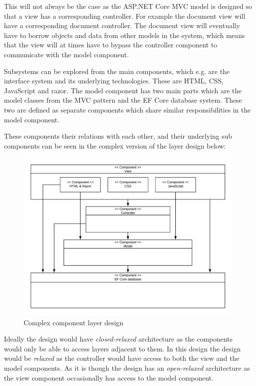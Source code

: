 This will not always be the case as the ASP.NET Core MVC model is designed so that a view has a corresponding controller.
For example the document view will have a corresponding document controller.
The document view will eventually have to borrow objects and data from other models in the system, which means that the view will at times have to bypass the controller component to communicate with the model component.

Subsystems can be explored from the main components, which e.g. are the interface system and its underlying technologies.
These are HTML, CSS, JavaScript and razor.
The model component has two main parts which are the model classes from the MVC pattern and the EF Core database system.
These two are defined as separate components which share similar responsibilities in the model component.

These components their relations with each other, and their underlying sub components can be seen in the complex version of the layer design below:

\begin{figure}[H]
	\centering
	\includegraphics[width=1\textwidth]{billeder/complexcomponents.jpeg}
	\caption{Complex component layer design}
\end{figure}

Ideally the design would have \textit{closed-relaxed} architecture as the components would only be able to access layers adjacent to them.
In this design the design would be \textit{relaxed} as the controller would have access to both the view and the model components.
As it is though the design has an \textit{open-relaxed} architecture as the view component occasionally has access to the model component.

